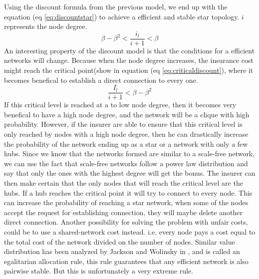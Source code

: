 Using the discount formula from the previous model, we end up with the equation (eq \ref{eq:discountstar}) to achieve a efficient and stable star topology. $i$ represents the node degree.
\begin{equation}
\beta-\beta^2<\frac{i_{l}}{i+1}< \beta
\label{eq:discountstar}
\end{equation}
An interesting property of the discount model is that the conditions for a efficient networks will change. Because
when the node degree increases, the insurance cost might reach the critical point(show in equation (eq \ref{eq:criticaldiscount}), where it becomes benefical to establish a direct connection to every one. \begin{equation}
\frac{I_{l}}{i+1}<\beta-\beta^2
\label{eq:criticaldiscount}
\end{equation}
If this critical level is reached at a to low node degree, then it becomes very benefical to have a high node degree, and the network will be a clique with high probability. However, if the insurer are able to ensure that this critical level is only reached by nodes with a high node degree, then he can drastically increase the probability of the network ending up as a star or a network with only a few hubs. Since we know that the networks formed are similar to a scale-free network, we can use the fact that scale-free networks follow a power law distribution and say that only the ones with the highest degree will get the bonus.  
 The insurer can then make certain that the only nodes that will reach the critical level are the hubs. If a hub reaches the critical point it will try to connect to every node. This can increase the probability of reaching a star network, when some of the nodes accept the request for establishing connection, they will maybe delete another direct connection. 
Another possibility for solving the problem with unfair costs, could be to use a shared-network cost instead. i.e. every node pays a cost equal to the total cost of the network divided on the number of nodes. 
Similar value distribution has been analyzed by Jackson and Wolinsky in \cite{jackson1996strategic}, and is called an egalitarian allocation rule, this rule guarantees that any efficient network is also pairwise stable. But this is unfortunately a very extreme rule.






